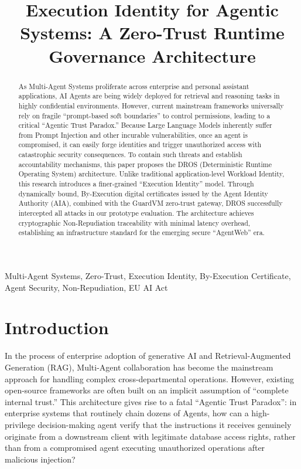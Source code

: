\documentclass[conference]{IEEEtran}
\begin{document}
\title{Execution Identity for Agentic Systems: A Zero-Trust Runtime Governance Architecture}

\author{
}

\maketitle

\begin{abstract}
As Multi-Agent Systems proliferate across enterprise and personal assistant applications, AI Agents are being widely deployed for retrieval and reasoning tasks in highly confidential environments. However, current mainstream frameworks universally rely on fragile ``prompt-based soft boundaries'' to control permissions, leading to a critical ``Agentic Trust Paradox.'' Because Large Language Models inherently suffer from Prompt Injection and other incurable vulnerabilities, once an agent is compromised, it can easily forge identities and trigger unauthorized access with catastrophic security consequences. To contain such threats and establish accountability mechanisms, this paper proposes the DROS (Deterministic Runtime Operating System) architecture. Unlike traditional application-level Workload Identity, this research introduces a finer-grained ``Execution Identity'' model. Through dynamically bound, By-Execution digital certificates issued by the Agent Identity Authority (AIA), combined with the GuardVM zero-trust gateway, DROS successfully intercepted all attacks in our prototype evaluation. The architecture achieves cryptographic Non-Repudiation traceability with minimal latency overhead, establishing an infrastructure standard for the emerging secure ``AgentWeb'' era.
\end{abstract}

\begin{IEEEkeywords}
Multi-Agent Systems, Zero-Trust, Execution Identity, By-Execution Certificate, Agent Security, Non-Repudiation, EU AI Act
\end{IEEEkeywords}

\section{Introduction}
In the process of enterprise adoption of generative AI and Retrieval-Augmented Generation (RAG), Multi-Agent collaboration has become the mainstream approach for handling complex cross-departmental operations. However, existing open-source frameworks are often built on an implicit assumption of ``complete internal trust.'' This architecture gives rise to a fatal ``Agentic Trust Paradox'': in enterprise systems that routinely chain dozens of Agents, how can a high-privilege decision-making agent verify that the instructions it receives genuinely originate from a downstream client with legitimate database access rights, rather than from a compromised agent executing unauthorized operations after malicious injection?
\end{document}
